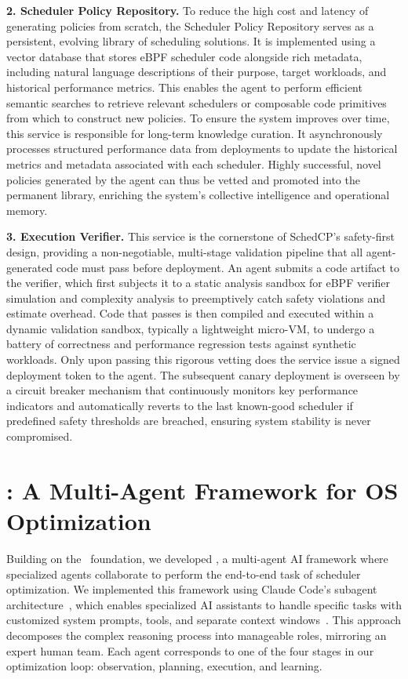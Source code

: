 \textbf{2. Scheduler Policy Repository.} To reduce the high cost and latency of generating policies from scratch, the Scheduler Policy Repository serves as a persistent, evolving library of scheduling solutions. It is implemented using a vector database that stores eBPF scheduler code alongside rich metadata, including natural language descriptions of their purpose, target workloads, and historical performance metrics. This enables the agent to perform efficient semantic searches to retrieve relevant schedulers or composable code primitives from which to construct new policies. To ensure the system improves over time, this service is responsible for long-term knowledge curation. It asynchronously processes structured performance data from deployments to update the historical metrics and metadata associated with each scheduler. Highly successful, novel policies generated by the agent can thus be vetted and promoted into the permanent library, enriching the system's collective intelligence and operational memory.

\textbf{3. Execution Verifier.} This service is the cornerstone of SchedCP's safety-first design, providing a non-negotiable, multi-stage validation pipeline that all agent-generated code must pass before deployment. An agent submits a code artifact to the verifier, which first subjects it to a static analysis sandbox for eBPF verifier simulation and complexity analysis to preemptively catch safety violations and estimate overhead. Code that passes is then compiled and executed within a dynamic validation sandbox, typically a lightweight micro-VM, to undergo a battery of correctness and performance regression tests against synthetic workloads. Only upon passing this rigorous vetting does the service issue a signed deployment token to the agent. The subsequent canary deployment is overseen by a circuit breaker mechanism that continuously monitors key performance indicators and automatically reverts to the last known-good scheduler if predefined safety thresholds are breached, ensuring system stability is never compromised.

\section{\agent: A Multi-Agent Framework for OS Optimization}
\label{sec:sched_agents}

Building on the \sys\ foundation, we developed \textbf{\agent}, a multi-agent AI framework where specialized agents collaborate to perform the end-to-end task of scheduler optimization. We implemented this framework using Claude Code's subagent architecture~\cite{anthropic2024subagents}, which enables specialized AI assistants to handle specific tasks with customized system prompts, tools, and separate context windows~\cite{anthropic2024multiagent}. This approach decomposes the complex reasoning process into manageable roles, mirroring an expert human team. Each agent corresponds to one of the four stages in our optimization loop: observation, planning, execution, and learning.

